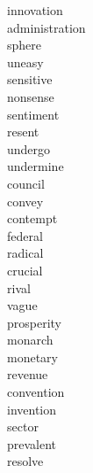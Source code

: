 \documentclass[a4paper, 10pt]{ctexart}
\begin{document}
\begin{multicols*}{2}
\begin{description}
\item[innovation]

\item[administration]

\item[sphere]

\item[uneasy]

\item[sensitive]

\item[nonsense]

\item[sentiment]

\item[resent]

\item[undergo]

\item[undermine]

\item[council]

\item[convey]

\item[contempt]

\item[federal]

\item[radical]

\item[crucial]

\item[rival]

\item[vague]

\item[prosperity]

\item[monarch]

\item[monetary]

\item[revenue]

\item[convention]

\item[invention]

\item[sector]

\item[prevalent]

\item[resolve]


\end{description}
\end{multicols*}
\end{document}
